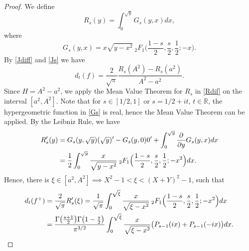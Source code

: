 \documentclass[10pt,a4paper]{amsart}
\begin{document}
\begin{proof}

We define $$R_s(y)=\int_0^{\sqrt{y}} G_s(y,x) dx,$$
where  
\begin{equation}\label{Gs}
    G_s(y,x)=x\sqrt{y-x^2}\:_{2}F_1\Big(\frac{1-s}{2},\frac{s}{2},\frac{1}{2};-x\Big).
\end{equation}
By \eqref{Jdiff} and \eqref{Js} we have 
\begin{equation}\label{Rdif}
    d_t(f)=\frac{2}{\sqrt{\pi}}\frac{R_s(A^2)-R_{s}(a^2)}{A^2-a^2}.
\end{equation}
Since $H=A^2-a^2$, we apply the Mean Value Theorem for $R_s$ in \eqref{Rdif} on the interval $[a^2,A^2]$. Note that for $s \in [1/2,1]$ or $s=1/2+it$, $t \in \mathbb{R}$, the hypergeometric function in \eqref{Gs} is real, hence the Mean Value Theorem can be applied. By the Leibniz Rule, we have
\begin{align}\notag
    \begin{split}
        R'_s(y)&= G_s(y,\sqrt{y})(\sqrt{y})'-G_s(y,0)0'+\int_0^{\sqrt{y}}\frac{\partial}{\partial y}G_s(y,x)dx \\
        &= \frac{1}{2}\int_0^{\sqrt{y}}\frac{x}{\sqrt{y-x^2}}\:_{2}F_1\Big(\frac{1-s}{2},\frac{s}{2},\frac{1}{2};-x^2\Big)dx.
   \end{split}
\end{align}
Hence, there is $\xi\in [a^2,A^2] \implies X^2-1<\xi<(X+Y)^2-1$, such that 
\begin{align}\notag
    \begin{split}
        d_{t}(f^{+})&=\frac{2}{\sqrt{\pi}}R'_s(\xi)=\frac{1}{\sqrt{\pi}}\int_0^{\sqrt{\xi}}\frac{x}{\sqrt{\xi-x^2}}\:_{2}F_1\Big(\frac{1-s}{2},\frac{s}{2},\frac{1}{2};-x^2\Big)dx\\
       &= \frac{\Gamma \big(\frac{s+1}{2}\big)\Gamma \big(1-\frac{s}{2}\big)}{\pi^{3/2}}\int_0^{\sqrt{\xi}}\frac{x}{\sqrt{\xi-x^2}}\big(P_{s-1}(ix)+P_{s-1}(-ix)\big)dx.
    \end{split}
\end{align}
\end{proof}
\end{document}
